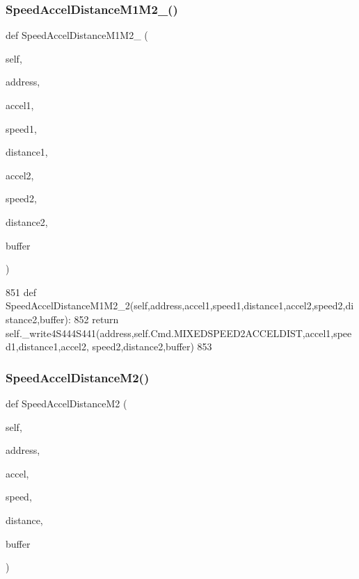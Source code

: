 \subsubsection{\texorpdfstring{Speed\+Accel\+Distance\+M1\+M2\+\_()}{SpeedAccelDistanceM1M2\_2()}}
{\footnotesize\ttfamily def Speed\+Accel\+Distance\+M1\+M2\+\_ (\begin{DoxyParamCaption}\item[{}]{self,  }\item[{}]{address,  }\item[{}]{accel1,  }\item[{}]{speed1,  }\item[{}]{distance1,  }\item[{}]{accel2,  }\item[{}]{speed2,  }\item[{}]{distance2,  }\item[{}]{buffer }\end{DoxyParamCaption})}


\begin{DoxyCode}
851     \textcolor{keyword}{def }SpeedAccelDistanceM1M2\_2(self,address,accel1,speed1,distance1,accel2,speed2,distance2,buffer):
852         \textcolor{keywordflow}{return} self.\_write4S444S441(address,self.Cmd.MIXEDSPEED2ACCELDIST,accel1,speed1,distance1,accel2,
      speed2,distance2,buffer)
853 
\end{DoxyCode}
\mbox{\label{classtoxic__hardware_1_1roboclaw__3_1_1Roboclaw_a445110f8fd4f9bbf61bcd9c4a5144ad7}} 
\subsubsection{\texorpdfstring{Speed\+Accel\+Distance\+M2()}{SpeedAccelDistanceM2()}}
{\footnotesize\ttfamily def Speed\+Accel\+Distance\+M2 (\begin{DoxyParamCaption}\item[{}]{self,  }\item[{}]{address,  }\item[{}]{accel,  }\item[{}]{speed,  }\item[{}]{distance,  }\item[{}]{buffer }\end{DoxyParamCaption})}


